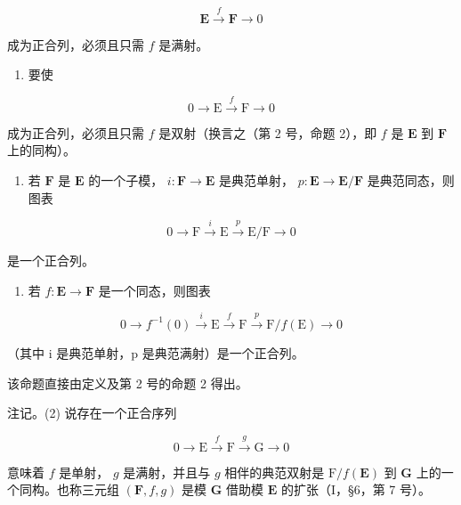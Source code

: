 \[
\mathbf {E} \xrightarrow {f} \mathbf {F} \longrightarrow 0
\]

成为正合列，必须且只需 \(f\) 是满射。

\begin{enumerate}
\def\labelenumi{(\alph{enumi})}
\setcounter{enumi}{2}
\tightlist
\item
  要使
\end{enumerate}

\[
0 \longrightarrow \mathrm{E} \stackrel {f} {\longrightarrow} \mathrm{F} \longrightarrow 0
\]

成为正合列，必须且只需 \(f\) 是双射（换言之（第 2 号，命题 2），即 \(f\) 是 \(\mathbf{E}\) 到 \(\mathbf{F}\) 上的同构）。

\begin{enumerate}
\def\labelenumi{(\alph{enumi})}
\setcounter{enumi}{3}
\tightlist
\item
  若 \(\mathbf{F}\) 是 \(\mathbf{E}\) 的一个子模， \(i: \mathbf{F} \to \mathbf{E}\) 是典范单射， \(p: \mathbf{E} \to \mathbf{E} / \mathbf{F}\) 是典范同态，则图表
\end{enumerate}

\[
0 \longrightarrow \mathrm{F} \stackrel {i} {\longrightarrow} \mathrm{E} \stackrel {p} {\longrightarrow} \mathrm{E} / \mathrm{F} \longrightarrow 0\tag{14}
\]

是一个正合列。

\begin{enumerate}
\def\labelenumi{(\alph{enumi})}
\setcounter{enumi}{4}
\tightlist
\item
  若 \(f: \mathbf{E} \to \mathbf{F}\) 是一个同态，则图表
\end{enumerate}

\[
0 \longrightarrow f ^ {- 1} (0) \stackrel {i} {\longrightarrow} \mathrm{E} \stackrel {f} {\longrightarrow} \mathrm{F} \stackrel {p} {\longrightarrow} \mathrm{F} / f (\mathrm{E}) \rightarrow 0
\]

（其中 i 是典范单射，p 是典范满射）是一个正合列。

该命题直接由定义及第 2 号的命题 2 得出。

注记。(2) 说存在一个正合序列

\[
0 \longrightarrow \mathrm{E} \stackrel {f} {\longrightarrow} \mathrm{F} \stackrel {g} {\longrightarrow} \mathrm{G} \longrightarrow 0
\]

意味着 \(f\) 是单射， \(g\) 是满射，并且与 \(g\) 相伴的典范双射是 \(\mathrm{F} / f(\mathbf{E})\) 到 \(\mathbf{G}\) 上的一个同构。也称三元组 \((\mathbf{F}, f, g)\) 是模 \(\mathbf{G}\) 借助模 \(\mathbf{E}\) 的扩张（I，§6，第 7 号）。

